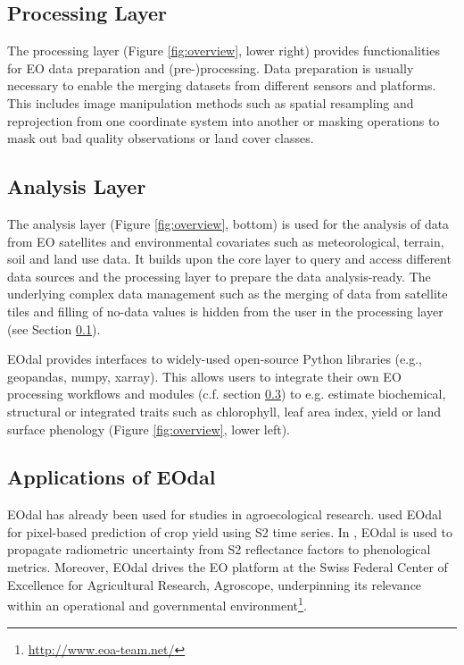 \subsection{Processing Layer}
\label{subsec:processing-layer}
The processing layer (Figure \ref{fig:overview}, lower right) provides functionalities for \gls{EO} data preparation and (pre-)processing. Data preparation is usually necessary to enable the merging datasets from different sensors and platforms. This includes image manipulation methods such as spatial resampling and reprojection from one coordinate system into another or masking operations to mask out bad quality observations or land cover classes.

\subsection{Analysis Layer}
The analysis layer (Figure \ref{fig:overview}, bottom) is used for the analysis of data from \gls{EO} satellites and environmental covariates such as meteorological, terrain, soil and land use data. It builds upon the core layer to query and access different data sources and the processing layer to prepare the data analysis-ready. The underlying complex data management such as the merging of data from satellite tiles and filling of no-data values is hidden from the user in the processing layer (see Section \ref{subsec:processing-layer}).

\gls{EOdal} provides interfaces to widely-used open-source Python libraries (e.g., geopandas, numpy, xarray). This allows users to integrate their own \gls{EO} processing workflows and modules (c.f. section \ref{subsec:supplementary-modules}) to e.g. estimate biochemical, structural or integrated traits such as chlorophyll, leaf area index, yield or land surface phenology (Figure \ref{fig:overview}, lower left). 

\subsection{Applications of EOdal}
\label{subsec:supplementary-modules}
\gls{EOdal} has already been used for studies in agroecological research. \citet{perich_pixel-based_2023} used \gls{EOdal} for pixel-based prediction of crop yield using S2 time series.  In \citet{graf_propagating_2022}, \gls{EOdal} is used to propagate radiometric uncertainty from \gls{S2} reflectance factors to phenological metrics. Moreover, \gls{EOdal} drives the \gls{EO} platform at the Swiss Federal Center of Excellence for Agricultural Research, Agroscope, underpinning its relevance within an operational and governmental environment\footnote{\url{http://www.eoa-team.net/}}.

